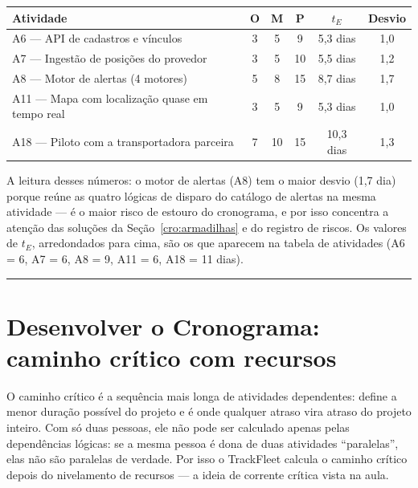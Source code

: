 \documentclass[11pt,a4paper]{article}
\newcommand{\separador}{\par\vspace{2mm}\hrule\vspace{4mm}}
\begin{document}
\begin{center}
\begin{tabularx}{\textwidth}{L c c c c c}
\toprule
\textbf{Atividade} & \textbf{O} & \textbf{M} & \textbf{P} & $t_E$ & \textbf{Desvio} \\
\midrule
A6 --- API de cadastros e vínculos & 3 & 5 & 9 & 5,3 dias & 1,0 \\
A7 --- Ingestão de posições do provedor & 3 & 5 & 10 & 5,5 dias & 1,2 \\
A8 --- Motor de alertas (4 motores) & 5 & 8 & 15 & 8,7 dias & 1,7 \\
A11 --- Mapa com localização quase em tempo real & 3 & 5 & 9 & 5,3 dias & 1,0 \\
A18 --- Piloto com a transportadora parceira & 7 & 10 & 15 & 10,3 dias & 1,3 \\
\bottomrule
\end{tabularx}
\end{center}

\noindent A leitura desses números: o motor de alertas (A8) tem o maior desvio (1,7 dia) porque reúne as quatro lógicas de disparo do catálogo de alertas na mesma atividade --- é o maior risco de estouro do cronograma, e por isso concentra a atenção das soluções da Seção~\ref{cro:armadilhas} e do registro de riscos. Os valores de $t_E$, arredondados para cima, são os que aparecem na tabela de atividades (A6 = 6, A7 = 6, A8 = 9, A11 = 6, A18 = 11 dias).

\separador

\section{Desenvolver o Cronograma: caminho crítico com recursos}\label{cro:caminho}

\noindent O caminho crítico é a sequência mais longa de atividades dependentes: define a menor duração possível do projeto e é onde qualquer atraso vira atraso do projeto inteiro. Com só duas pessoas, ele não pode ser calculado apenas pelas dependências lógicas: se a mesma pessoa é dona de duas atividades ``paralelas'', elas não são paralelas de verdade. Por isso o TrackFleet calcula o caminho crítico depois do nivelamento de recursos --- a ideia de corrente crítica vista na aula.
\end{document}
